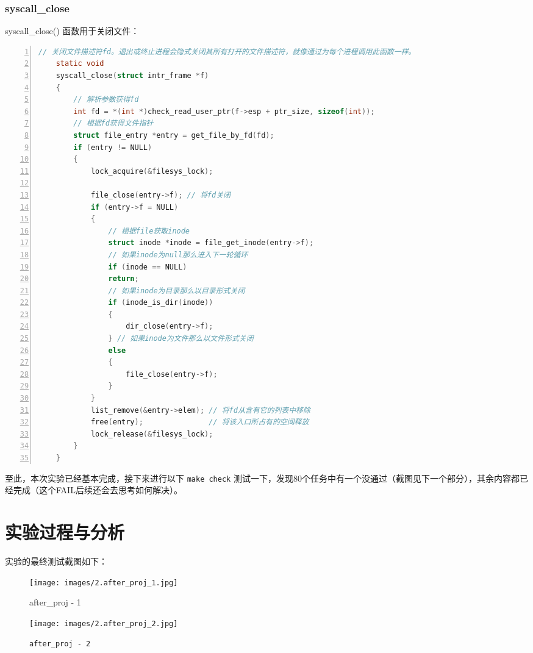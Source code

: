 \documentclass{article}
\begin{document}
	\subsubsection{syscall\_close}
	
	syscall\_close() 函数用于关闭文件：
	
	\begin{lstlisting}[xleftmargin = 4em,xrightmargin = 4em, aboveskip = 1em, numbers = left, language = C,title=src/userprog/syscall.c - syscall\_close()]
    // 关闭文件描述符fd。退出或终止进程会隐式关闭其所有打开的文件描述符，就像通过为每个进程调用此函数一样。
    static void
    syscall_close(struct intr_frame *f)
    {
        // 解析参数获得fd
        int fd = *(int *)check_read_user_ptr(f->esp + ptr_size, sizeof(int));
        // 根据fd获得文件指针
        struct file_entry *entry = get_file_by_fd(fd);
        if (entry != NULL)
        {
            lock_acquire(&filesys_lock);
            
            file_close(entry->f); // 将fd关闭
            if (entry->f = NULL)
            {
                // 根据file获取inode
                struct inode *inode = file_get_inode(entry->f);
                // 如果inode为null那么进入下一轮循环
                if (inode == NULL)
                return;
                // 如果inode为目录那么以目录形式关闭
                if (inode_is_dir(inode))
                {
                    dir_close(entry->f);
                } // 如果inode为文件那么以文件形式关闭
                else
                {
                    file_close(entry->f);
                }
            }
            list_remove(&entry->elem); // 将fd从含有它的列表中移除
            free(entry);               // 将该入口所占有的空间释放
            lock_release(&filesys_lock);
        }
    }
	\end{lstlisting}
	
	至此，本次实验已经基本完成，接下来进行以下 \texttt{make check} 测试一下，发现80个任务中有一个没通过（截图见下一个部分），其余内容都已经完成（这个FAIL后续还会去思考如何解决）。
	
	\section{实验过程与分析}
	
	实验的最终测试截图如下：
	
	\begin{figure}[H]
		\centering
		\begin{minipage}[b]{0.45\textwidth}
			\texttt{[image: images/2.after\_proj\_1.jpg]}
			\caption{after\_proj - 1}
		\end{minipage}
		\hfill
		\begin{minipage}[b]{0.45\textwidth}
			\texttt{[image: images/2.after\_proj\_2.jpg]}
			\caption{\texttt{after\_proj - 2}}
		\end{minipage}
	\end{figure}
	
\end{document}
